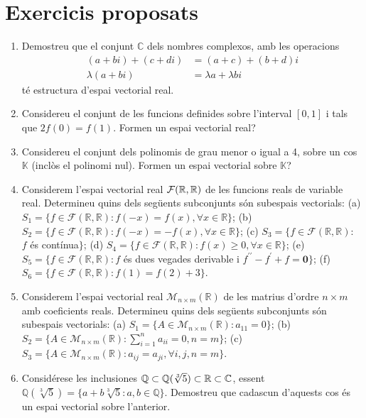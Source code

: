 


\chapter{Exercicis proposats}

\begin{enumerate}
\item Demostreu que el conjunt $\mathbb{C}$ dels nombres complexos,
amb les operacions%
\begin{align*}
(a+bi)+(c+di) &=(a+c)+(b+d)i \\
\lambda (a+bi) &=\lambda a+\lambda bi
\end{align*}%
té estructura d’espai vectorial real.

\item Considereu el conjunt de les funcions definides sobre l'interval $%
[0,1]$ i tals que $2f(0)=f(1)$. Formen un espai
vectorial real?

\item Considereu el conjunt dels polinomis de grau menor o igual a
4, sobre un cos $\mathbb{K}$ (inclòs el polinomi nul).
Formen un espai vectorial sobre $\mathbb{K}$?

\item Considerem l’espai vectorial real $\mathcal{F}(\mathbb{R},\mathbb{%
R})$ de les funcions reals de variable real. Determineu quins dels
següents subconjunts són subespais vectorials: (a) $S_{1}=\{f\in 
\mathcal{F}(\mathbb{R},\mathbb{R}):f(-x)=f(x),\forall x\in \mathbb{R}\}$;
(b) $S_{2}=\{f\in \mathcal{F}(\mathbb{R},\mathbb{R}):f(-x)=-f(x),\forall
x\in \mathbb{R}\}$; (c) $S_{3}=\{f\in \mathcal{F}(\mathbb{R},\mathbb{R}):$ $%
f $ és contínua$\}$; (d) $S_{4}=\{f\in \mathcal{F}(\mathbb{R},\mathbb{R}%
):f(x)\geq 0,\forall x\in \mathbb{R}\}$; (e) $S_{5}=\{f\in \mathcal{F}(%
\mathbb{R},\mathbb{R}):f$ és dues vegades derivable i $f^{\prime \prime
}-f^{\prime }+f=\mathbf{0}\}$; (f) $S_{6}=\{f\in \mathcal{F}(\mathbb{R},%
\mathbb{R}):f(1)=f(2)+3\}$.

\item Considerem l’espai vectorial real $\mathcal{M}_{n\times m}(%
\mathbb{R})$ de les matrius d’ordre $n\times m$ amb coeficients reals.
Determineu quins dels següents subconjunts són subespais
vectorials: (a) $S_{1}=\{A\in \mathcal{M}_{n\times m}(\mathbb{R}%
):a_{11}=0\} $; (b) $S_{2}=\{A\in \mathcal{M}_{n\times m}(\mathbb{R}%
):\sum_{i=1}^{n}a_{ii}=0,n=m\}$; (c) $S_{3}=\{A\in \mathcal{M}_{n\times m}(%
\mathbb{R}):a_{ij}=a_{ji},\forall i,j,n=m\}$.

\item Considérese les inclusiones $\mathbb{Q}\subset \mathbb{Q}(\sqrt[3]{%
5})\subset \mathbb{R}\subset \mathbb{C}$, essent $\mathbb{Q}(\sqrt[3]{5}%
)=\{a+b\sqrt[3]{5}:a,b\in \mathbb{Q}\}$. Demostreu que cadascun d’aquests
cos és un espai vectorial sobre l'anterior.


\end{enumerate}
